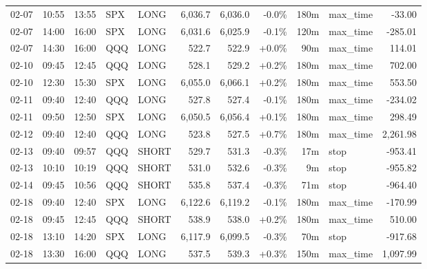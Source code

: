 \documentclass[11pt,a4paper,twoside]{article}
\begin{document}
\begin{center}
\begin{longtable}{>{\color{txtmain}}l l l l l r r r r >{\color{txtmain}}l r}
02-07 & 10:55 & 13:55 & SPX & LONG & 6,036.7 & 6,036.0 & \textcolor{lossred}{-0.0\%} & 180m & max\_time & \textcolor{lossred}{-33.00} \\
02-07 & 14:00 & 16:00 & SPX & LONG & 6,031.6 & 6,025.9 & \textcolor{lossred}{-0.1\%} & 120m & max\_time & \textcolor{lossred}{-285.01} \\
02-07 & 14:30 & 16:00 & QQQ & LONG & 522.7 & 522.9 & \textcolor{wingreen}{+0.0\%} & 90m & max\_time & \textcolor{wingreen}{114.01} \\
02-10 & 09:45 & 12:45 & QQQ & LONG & 528.1 & 529.2 & \textcolor{wingreen}{+0.2\%} & 180m & max\_time & \textcolor{wingreen}{702.00} \\
02-10 & 12:30 & 15:30 & SPX & LONG & 6,055.0 & 6,066.1 & \textcolor{wingreen}{+0.2\%} & 180m & max\_time & \textcolor{wingreen}{553.50} \\
02-11 & 09:40 & 12:40 & QQQ & LONG & 527.8 & 527.4 & \textcolor{lossred}{-0.1\%} & 180m & max\_time & \textcolor{lossred}{-234.02} \\
02-11 & 09:50 & 12:50 & SPX & LONG & 6,050.5 & 6,056.4 & \textcolor{wingreen}{+0.1\%} & 180m & max\_time & \textcolor{wingreen}{298.49} \\
02-12 & 09:40 & 12:40 & QQQ & LONG & 523.8 & 527.5 & \textcolor{wingreen}{+0.7\%} & 180m & max\_time & \textcolor{wingreen}{2,261.98} \\
02-13 & 09:40 & 09:57 & QQQ & SHORT & 529.7 & 531.3 & \textcolor{lossred}{-0.3\%} & 17m & stop & \textcolor{lossred}{-953.41} \\
02-13 & 10:10 & 10:19 & QQQ & SHORT & 531.0 & 532.6 & \textcolor{lossred}{-0.3\%} & 9m & stop & \textcolor{lossred}{-955.82} \\
02-14 & 09:45 & 10:56 & QQQ & SHORT & 535.8 & 537.4 & \textcolor{lossred}{-0.3\%} & 71m & stop & \textcolor{lossred}{-964.40} \\
02-18 & 09:40 & 12:40 & SPX & LONG & 6,122.6 & 6,119.2 & \textcolor{lossred}{-0.1\%} & 180m & max\_time & \textcolor{lossred}{-170.99} \\
02-18 & 09:45 & 12:45 & QQQ & SHORT & 538.9 & 538.0 & \textcolor{wingreen}{+0.2\%} & 180m & max\_time & \textcolor{wingreen}{510.00} \\
02-18 & 13:10 & 14:20 & SPX & LONG & 6,117.9 & 6,099.5 & \textcolor{lossred}{-0.3\%} & 70m & stop & \textcolor{lossred}{-917.68} \\
02-18 & 13:30 & 16:00 & QQQ & LONG & 537.5 & 539.3 & \textcolor{wingreen}{+0.3\%} & 150m & max\_time & \textcolor{wingreen}{1,097.99} \\

\end{longtable}
\end{center}
\end{document}
